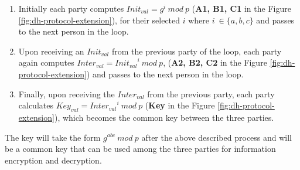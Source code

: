 \documentclass[11pt,letterpaper]{article}
\newenvironment{answer}{\em \color{blue} \begin{adjustwidth}{1cm}{1cm}}{\end{adjustwidth}}
\begin{document}
\begin{enumerate}
\begin{answer}
\begin{enumerate}
			\item Initially each party computes $Init_{val} = g^i ~mod~ p$ (\textbf{A1, B1, C1} in the Figure \ref{fig:dh-protocol-extension}), for their selected $i$ where $i ~\in \{a, b, c\}$ and passes to the next person in the loop.
			
			\item Upon receiving an $Init_{val}$ from the previous party of the loop, each party again computes $Inter_{val} = {Init_{val}}^i ~mod~ p$, (\textbf{A2, B2, C2} in the Figure \ref{fig:dh-protocol-extension}) and passes to the next person in the loop.
			
			\item Finally, upon receiving the $Inter_{val}$ from the previous party, each party calculates $Key_{val} = {Inter_{val}}^i ~mod~ p$ (\textbf{Key} in the Figure \ref{fig:dh-protocol-extension}), which becomes the common key between the three parties.
		\end{enumerate}
	
	The key will take the form $g^{abc} ~mod ~p$ after the above described process and will be a common key that can be used among the three parties for information encryption and decryption.
		

\end{answer}
\end{enumerate}
\end{document}
